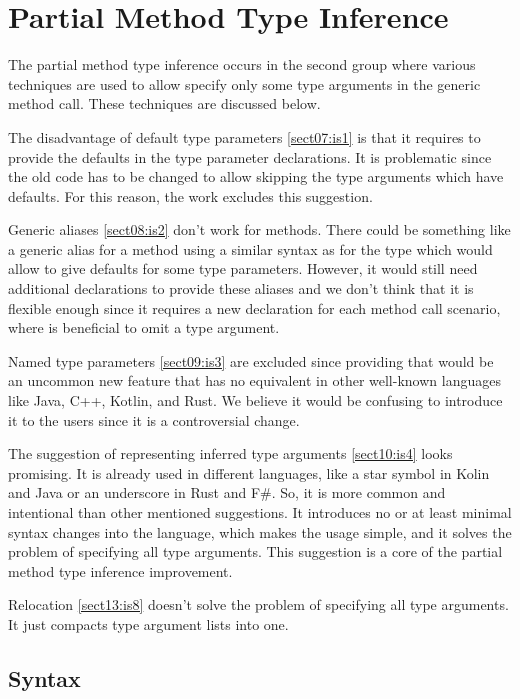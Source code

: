\section{Partial Method Type Inference}

The partial method type inference occurs in the second group where various techniques are used to allow specify only some type arguments in the generic method call.
These techniques are discussed below.
\par
The disadvantage of default type parameters \ref{sect07:is1} is that it requires to provide the defaults in the type parameter declarations.
It is problematic since the old code has to be changed to allow skipping the type arguments which have defaults.
For this reason, the work excludes this suggestion.
\par
Generic aliases \ref{sect08:is2} don't work for methods.
There could be something like a generic alias for a method using a similar syntax as for the type which would allow to give defaults for some type parameters.
However, it would still need additional declarations to provide these aliases and we don't think that it is flexible enough since it requires a new declaration for each method call scenario, where is beneficial to omit a type argument.
\par
Named type parameters \ref{sect09:is3} are excluded since providing that would be an uncommon new feature that has no equivalent in other well-known languages like Java, C++, Kotlin, and Rust. 
We believe it would be confusing to introduce it to the users since it is a controversial change.
\par
The suggestion of representing inferred type arguments \ref{sect10:is4} looks promising.
It is already used in different languages, like a star symbol in Kolin and Java or an underscore in Rust and F\#. 
So, it is more common and intentional than other mentioned suggestions. 
It introduces no or at least minimal syntax changes into the language, which makes the usage simple, and it solves the problem of specifying all type arguments.
This suggestion is a core of the partial method type inference improvement.
\par
Relocation \ref{sect13:is8} doesn’t solve the problem of specifying all type arguments. 
It just compacts type argument lists into one.

\subsection{Syntax}

